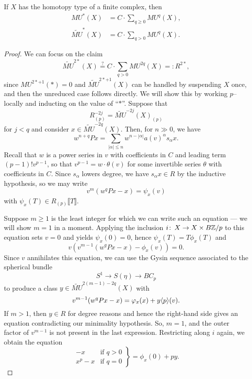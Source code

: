 \begin{theorem}
If $X$ has the homotopy type of a finite complex, then
\begin{align*}
MU^*(X) & = C \cdot \sum_{q \ge 0} MU^q(X), \\
\widetilde{MU}^*(X) & = C \cdot \sum_{q > 0} MU^q(X).
\end{align*}
\end{theorem}
\begin{proof}
We can focus on the claim \[\widetilde{MU}^{2*}(X) \stackrel{?}{=} C \cdot \sum_{q > 0} MU^{2q}(X) =: R^{2*},\] since $MU^{2*+1}(*) = 0$ and $\widetilde{MU}^{2*+1}(X)$ can be handled by suspending $X$ once, and then the unreduced case follows directly.  We will show this by working $p$--locally and inducting on the value of ``$*$''.  Suppose that \[R^{-2j}_{(p)} = \widetilde{MU}^{-2j}(X)_{(p)}\] for $j < q$ and consider $x \in \widetilde{MU}^{-2q}(X)$.  Then, for $n \gg 0$, we have \[w^{n+q} P x = \sum_{|\alpha| \le n} w^{n - |\alpha|} a(v)^\alpha s_\alpha x.\]  Recall that $w$ is a power series in $v$ with coefficients in $C$ and leading term $(p-1)! v^{p-1}$, so that $v^{p-1} = w \cdot \theta(v)$ for some invertible series $\theta$ with coefficients in $C$.  Since $s_\alpha$ lowers degree, we have $s_\alpha x \in R$ by the inductive hypothesis, so we may write \[v^m(w^qPx - x) = \psi_x(v)\] with $\psi_x(T) \in R_{(p)}\llbracket T \rrbracket$.

Suppose $m \ge 1$ is the least integer for which we can write such an equation --- we will show $m = 1$ in a moment.  Applying the inclusion $i\colon\thinspace X \to X \times B\mathbb Z/p$ to this equation sets $v = 0$ and yields $\psi_x(0) = 0$, hence $\psi_x(T) = T \phi_x(T)$ and \[v (v^{m-1}(w^qPx - x) - \phi_x(v)) = 0.\]  Since $v$ annihilates this equation, we can use the Gysin sequence associated to the spherical bundle \[S^1 \to S(\eta) \to BC_p\] to produce a class $y \in \widetilde{MU}^{2(m-1)-2q}(X)$ with \[v^{m-1}(w^q P x - x) = \varphi_x(x) + y \langle p\rangle(v).\]  If $m > 1$, then $y \in R$ for degree reasons and hence the right-hand side gives an equation contradicting our minimality hypothesis.  So, $m = 1$, and the outer factor of $v^{m-1}$ is not present in the last expression.  Restricting along $i$ again, we obtain the equation \[\left. \begin{array}{rr} -x & \text{if $q > 0$} \\ x^p - x & \text{if $q = 0$} \end{array} \right\} = \phi_x(0) + py.\]


\end{proof}
